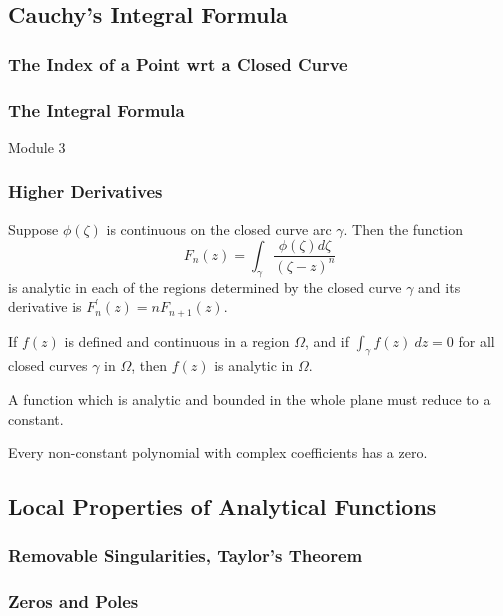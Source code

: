 \subsection{Cauchy's Integral Formula}
\subsubsection{The Index of a Point wrt a Closed Curve}
\subsubsection{The Integral Formula}
\pagebreak

{\Large Module 3 }
\subsubsection{Higher Derivatives}
\label{sect:higherDerivatives}
\begin{lemma}
	Suppose $\phi(\zeta)$ is continuous on the closed curve arc $\gamma$. Then the function
	\begin{equation}
		F_n(z) = \int_\gamma \frac{\phi(\zeta)d\zeta}{(\zeta-z)^n}
	\end{equation}
	is analytic in each of the regions determined by the closed curve $\gamma$ and its derivative is $F_n^\prime(z) = nF_{n+1}(z)$.
\end{lemma}
\begin{theorem}[Morera]
	If $f(z)$ is defined and continuous in a region $\Omega$, and if $\int_\gamma f(z)\ dz = 0$ for all closed curves $\gamma$ in $\Omega$, then $f(z)$ is analytic in $\Omega$.
\end{theorem}
\begin{theorem}[Liouville]
	A function which is analytic and bounded in the whole plane must reduce to a constant.
\end{theorem}
\begin{theorem}
	Every non-constant polynomial with complex coefficients has a zero.
	\label{thm:fundamental}
\end{theorem}
\subsection{Local Properties of Analytical Functions}
\subsubsection{Removable Singularities, Taylor's Theorem}
\subsubsection{Zeros and Poles}

